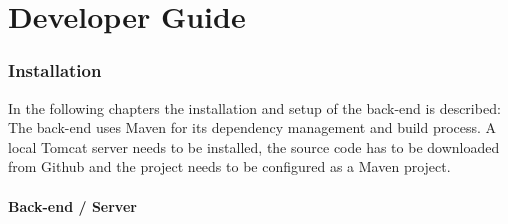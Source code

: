 \part*{Developer Guide}

\section{Installation}
\label{chap:installation}
In the following chapters the installation and setup of the back-end is described: The back-end uses Maven for its dependency management and build process. A local Tomcat server needs to be installed, the source code has to be downloaded from Github and the project needs to be configured as a Maven project.
\subsection{Back-end / Server}
